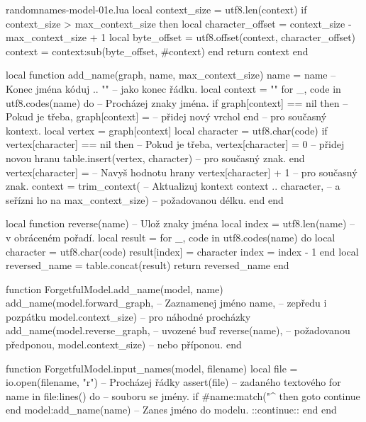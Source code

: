 \documentclass{csbulletin}
\begin{document}
\begin{filecontents}{randomnames-model-01e.lua}
  local context_size = utf8.len(context)
  if context_size > max_context_size then
    local character_offset = context_size - max_context_size + 1
    local byte_offset = utf8.offset(context, character_offset)
    context = context:sub(byte_offset, #context)
  end
  return context
end

local function add_name(graph, name, max_context_size)
  name = name                            -- Konec jména kóduj
       .. "\n"                           -- jako konec řádku.
  local context = ""
  for _, code in utf8.codes(name) do     -- Procházej znaky jména.
    if graph[context] == nil then        -- Pokud je třeba,
      graph[context] = {}                -- přidej nový vrchol
    end                                  -- pro současný kontext.
    local vertex = graph[context]
    local character = utf8.char(code)
    if vertex[character] == nil then     -- Pokud je třeba,
      vertex[character] = 0              -- přidej novou hranu
      table.insert(vertex, character)    -- pro současný znak.
    end
    vertex[character] =                  -- Navyš hodnotu hrany
      vertex[character] + 1              -- pro současný znak.
    context = trim_context(              -- Aktualizuj kontext
      context .. character,              -- a seřízni ho na
      max_context_size)                  -- požadovanou délku.
  end
end

local function reverse(name)             -- Ulož znaky jména
  local index = utf8.len(name)           -- v obráceném pořadí.
  local result = {}
  for _, code in utf8.codes(name) do
    local character = utf8.char(code)
    result[index] = character
    index = index - 1
  end
  local reversed_name = table.concat(result)
  return reversed_name
end

function ForgetfulModel.add_name(model, name)
  add_name(model.forward_graph,          -- Zaznamenej jméno
           name,                         -- zepředu i pozpátku
           model.context_size)           -- pro náhodné procházky
  add_name(model.reverse_graph,          -- uvozené buď
           reverse(name),                -- požadovanou předponou,
           model.context_size)           -- nebo příponou.
end

function ForgetfulModel.input_names(model, filename)
  local file = io.open(filename, "r")    -- Procházej řádky
  assert(file)                           -- zadaného textového
  for name in file:lines() do            -- souboru se jmény.
    if #name:match("^%
      then goto continue end
    model:add_name(name)                 -- Zanes jméno do modelu.
    ::continue::
  end
end
\end{filecontents}
\end{document}
